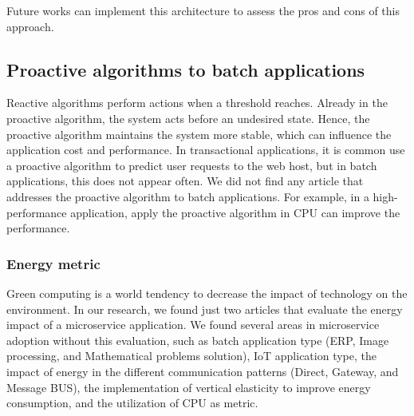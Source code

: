 Future works can implement this architecture to assess the pros and cons of this approach.

\subsection{Proactive algorithms to batch applications}
Reactive algorithms perform actions when a threshold reaches. Already in the proactive algorithm, the system acts before an undesired state. Hence, the proactive algorithm maintains the system more stable, which can influence the application cost and performance. In transactional applications, it is common use a proactive algorithm to predict user requests to the web host, but in batch applications, this does not appear often. We did not find any article that addresses the proactive algorithm to batch applications. For example, in a high-performance application, apply the proactive algorithm in CPU can improve the performance. 

\subsubsection{Energy metric}
Green computing is a world tendency to decrease the impact of technology on the environment. In our research, we found just two articles that evaluate the energy impact of a microservice application. We found several areas in microservice adoption without this evaluation, such as batch application type (ERP, Image processing, and Mathematical problems solution), IoT application type, the impact of energy in the different communication patterns (Direct, Gateway, and Message BUS), the implementation of vertical elasticity to improve energy consumption, and the utilization of CPU as metric.
